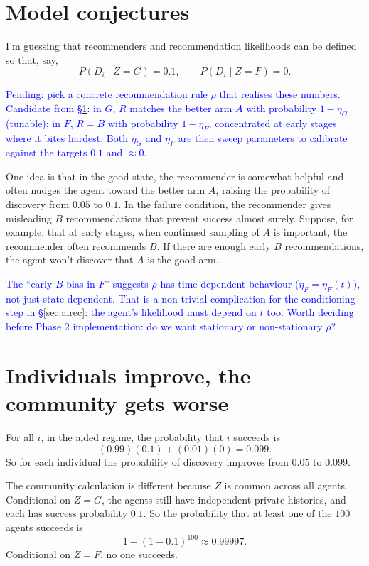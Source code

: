 \documentclass[12pt]{article}
\newcommand{\ignacio}[1]{\textcolor{blue}{#1}}
\begin{document}
\section{Model conjectures}
\label{sec:conj}

I'm guessing that recommenders and recommendation likelihoods can be defined so that, say,
\[
  P(D_i \mid Z = G) = 0.1, \qquad P(D_i \mid Z = F) = 0.
\]

\ignacio{Pending: pick a concrete recommendation rule $\rho$ that realises these numbers. Candidate from \S\ref{sec:conj}: in $G$, $R$ matches the better arm $A$ with probability $1 - \eta_G$ (tunable); in $F$, $R = B$ with probability $1 - \eta_F$, concentrated at early stages where it bites hardest. Both $\eta_G$ and $\eta_F$ are then sweep parameters to calibrate against the targets $0.1$ and $\approx 0$.}

One idea is that in the good state, the recommender is somewhat helpful and often nudges the agent toward the better arm $A$, raising the probability of discovery from $0.05$ to $0.1$.
In the failure condition, the recommender gives misleading $B$ recommendations that prevent success almost surely.
Suppose, for example, that at early stages, when continued sampling of $A$ is important, the recommender often recommends $B$.
If there are enough early $B$ recommendations, the agent won't discover that $A$ is the good arm.

\ignacio{The ``early $B$ bias in $F$'' suggests $\rho$ has time-dependent behaviour ($\eta_F = \eta_F(t)$), not just state-dependent. That is a non-trivial complication for the conditioning step in \S\ref{sec:airec}: the agent's likelihood must depend on $t$ too. Worth deciding before Phase 2 implementation: do we want stationary or non-stationary $\rho$?}

\section{Individuals improve, the community gets worse}
\label{sec:improve}

For all $i$, in the aided regime, the probability that $i$ succeeds is
\[
  (0.99)(0.1) + (0.01)(0) = 0.099.
\]
So for each individual the probability of discovery improves from $0.05$ to $0.099$.

The community calculation is different because $Z$ is common across all agents.
Conditional on $Z = G$, the agents still have independent private histories, and each has success probability $0.1$.
So the probability that at least one of the $100$ agents succeeds is
\[
  1 - (1 - 0.1)^{100} \approx 0.99997.
\]
Conditional on $Z = F$, no one succeeds.
\end{document}
